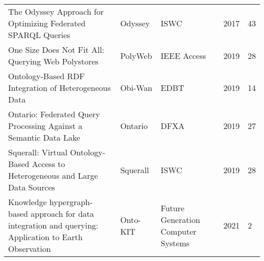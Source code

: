 \begin{table*}[tbp]
\begin{tabular}{|L{5cm}||l||lll|}
	  The Odyssey Approach for Optimizing Federated SPARQL Queries \cite{ODYSSEY} & Odyssey & ISWC & 2017 & 43 \\
	    
	  One Size Does Not Fit All: Querying {Web} Polystores \cite{PolyWeb} & PolyWeb & IEEE Access & 2019 & 28\\
	    
	    Ontology-Based RDF Integration of Heterogeneous Data \cite{Obi-Wan,Obi-Wan1} & Obi-Wan & EDBT & 2019 & 14\\
	    
	   Ontario: Federated Query Processing Against a Semantic Data Lake  \cite{Ontario} &Ontario &  DFXA & 2019 & 27 \\
	   
	   Squerall: Virtual Ontology-Based Access to Heterogeneous and Large Data
	   Sources \cite{Squerall} & Squerall & ISWC & 2019 & 28\\
	    
	    Knowledge hypergraph-based approach for data integration and querying:
	    Application to {Earth} Observation \cite{Onto-KIT} & Onto-KIT & Future Generation Computer Systems & 2021 & 2 \\ 
 
	   \hline
	\end{tabular}
\end{table*}
